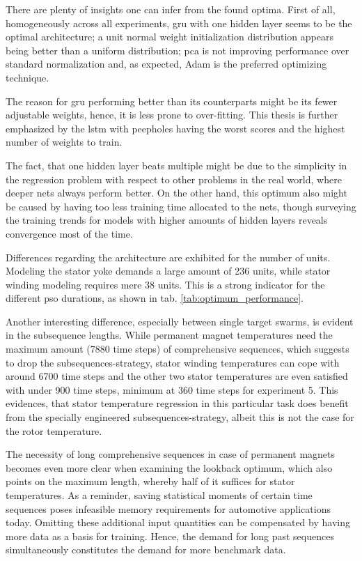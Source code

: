 There are plenty of insights one can infer from the found optima.
First of all, homogeneously across all experiments, \gls{gru} with one hidden layer seems to be the optimal architecture; a unit normal weight initialization distribution appears being better than a uniform distribution; \gls{pca} is not improving performance over standard normalization and, as expected, Adam is the preferred optimizing technique.

The reason for \gls{gru} performing better than its counterparts might be its fewer adjustable weights, hence, it is less prone to over-fitting.
This thesis is further emphasized by the \gls{lstm} with peepholes having the worst scores and the highest number of weights to train.

The fact, that one hidden layer beats multiple might be due to the simplicity in the regression problem with respect to other problems in the real world, where deeper nets always perform better.
On the other hand, this optimum also might be caused by having too less training time allocated to the nets, though surveying the training trends for models with higher amounts of hidden layers reveals convergence most of the time.

Differences regarding the architecture are exhibited for the number of units.
Modeling the stator yoke demands a large amount of 236 units, while stator winding modeling requires mere 38 units.
This is a strong indicator for the different \gls{pso} durations, as shown in tab. \ref{tab:optimum_performance}.

Another interesting difference, especially between single target swarms, is evident in the subsequence lengths.
While permanent magnet temperatures need the maximum amount (7880 time steps) of comprehensive sequences, which suggests to drop the subsequences-strategy, stator winding temperatures can cope with around 6700 time steps and the other two stator temperatures are even satisfied with under 900 time steps, minimum at 360 time steps for experiment 5.
This evidences, that stator temperature regression in this particular task does benefit from the specially engineered subsequences-strategy, albeit this is not the case for the rotor temperature.

The necessity of long comprehensive sequences in case of permanent magnets becomes even more clear when examining the lookback optimum, which also points on the maximum length, whereby half of it suffices for stator temperatures.
As a reminder, saving statistical moments of certain time sequences poses infeasible memory requirements for automotive applications today.
Omitting these additional input quantities can be compensated by having more data as a basis for training.
Hence, the demand for long past sequences simultaneously constitutes the demand for more benchmark data.

